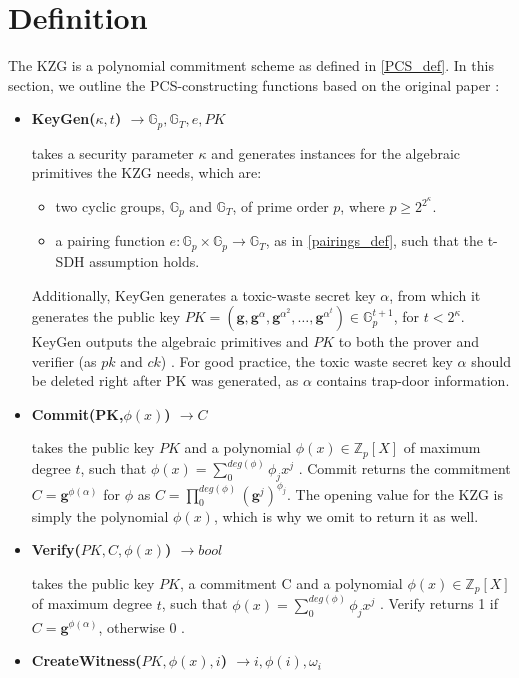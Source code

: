 \section*{Definition}
\label{Def}
The KZG is a polynomial commitment scheme as defined in \ref{PCS_def}. In this section, we outline the PCS-constructing functions based on the original paper \parencite{KZG}:
\begin{itemize}
    \item \textbf{KeyGen($\kappa,t$) $\rightarrow \mathbb{G}_p, \mathbb{G}_T, e, PK$} 
    
    takes a security parameter $\kappa$ and generates instances for the algebraic primitives the KZG needs, which are: 
    \begin{itemize}
        \item two cyclic groups, $\mathbb{G}_p$ and $\mathbb{G}_T$, of prime order $p$, where $p\ge2^{2^\kappa}$.
        \item a pairing function $e: \mathbb{G}_p \times \mathbb{G}_p \rightarrow \mathbb{G}_T$, as in \ref{pairings_def}, such that the t-SDH assumption holds.
    \end{itemize}
    \parencite{KZG}
    Additionally, KeyGen generates a toxic-waste secret key $\alpha$, from which it generates the public key $PK=(\mathbf{g}, \mathbf{g}^\alpha, \mathbf{g}^{\alpha^2},\dots,\mathbf{g}^{\alpha^t})\in \mathbb{G}_p^{t+1}$, for $t<2^\kappa$. KeyGen outputs the algebraic primitives and $PK$ to both the prover and verifier (as $pk$ and $ck$) \parencite{KZG}. 
    For good practice, the toxic waste secret key $\alpha$ should be deleted right after PK was generated, as $\alpha$ contains trap-door information. 
    \item \textbf{Commit(PK,$\phi(x)$) $\rightarrow C$}

    takes the public key $PK$ and a polynomial $\phi(x) \in \mathbb{Z}_p[X]$
    of maximum degree $t$, such that $\phi(x)=\sum_{0}^{deg(\phi)}\phi_jx^j$
    \parencite{KZG}. Commit returns the commitment $C=\mathbf{g}^{\phi(\alpha)}$ for $\phi$ as $C=\prod_{0}^{deg(\phi)}(\mathbf{g}^j)^{\phi_j}$\parencite{KZG}.
    The opening value for the KZG is simply the polynomial $\phi(x)$, which is why we omit to return it as well.

    \item \textbf{Verify($PK,C,\phi(x)$) $\rightarrow bool$}

    takes the public key $PK$, a commitment C and a polynomial $\phi(x) \in \mathbb{Z}_p[X]$ of maximum degree $t$, such that $\phi(x)=\sum_{0}^{deg(\phi)}\phi_jx^j$ \parencite{KZG}. Verify returns 1 if $C=\mathbf{g}^{\phi(\alpha)}$, otherwise 0 \parencite{KZG}.
    \item \textbf{CreateWitness($PK, \phi(x), i$) $\rightarrow i,\phi(i),\omega_i$ }


\end{itemize}
